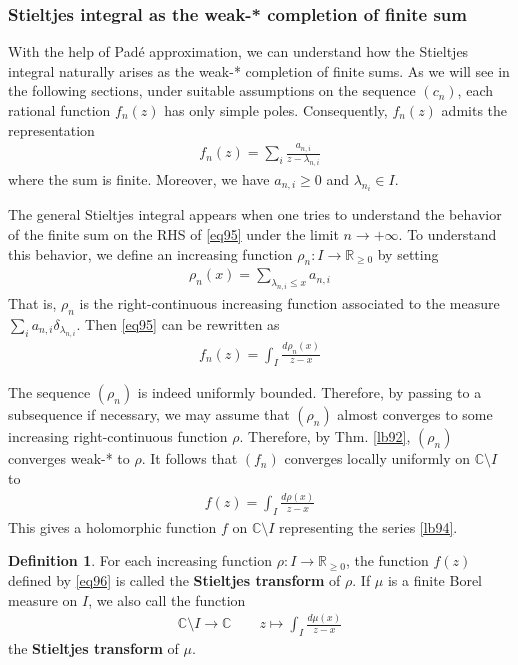\documentclass[12pt,b5paper,notitlepage]{article}
\theoremstyle{definition}
\newtheorem{df}{Definition}[subsection]
\theoremstyle{plain}
\newcommand{\Cbb}{\mathbb C}
\newcommand{\Rbb}{\mathbb R}
\numberwithin{equation}{section}
\begin{document}
\subsubsection{Stieltjes integral as the weak-* completion of finite sum}


With the help of Pad\'e approximation, we can understand how the Stieltjes integral naturally arises as the weak-* completion of finite sums. As we will see in the following sections, under suitable assumptions on the sequence $(c_n)$, each rational function $f_n(z)$ has only simple poles. Consequently, $f_n(z)$ admits the representation
\begin{align}\label{eq95}
f_n(z)=\sum_i \frac{a_{n,i}}{z-\lambda_{n,i}}
\end{align}
where the sum is finite. Moreover, we have $a_{n,i}\geq0$ and $\lambda_{n_i}\in I$.


The general Stieltjes integral appears when one tries to understand the behavior of the finite sum on the RHS of \eqref{eq95} under the limit $n\rightarrow+\infty$. To understand this behavior, we define an increasing function $\rho_n:I\rightarrow\Rbb_{\geq0}$ by setting
\begin{align*}
\rho_n(x)=\sum_{\lambda_{n,i}\leq x}a_{n,i}
\end{align*}
That is, $\rho_n$ is the right-continuous increasing function associated to the measure $\sum_i a_{n,i}\delta_{\lambda_{n,i}}$. Then \eqref{eq95} can be rewritten as
\begin{align*}
f_n(z)=\int_I \frac{d\rho_n(x)}{z-x}
\end{align*}


The sequence $(\rho_n)$ is indeed uniformly bounded. Therefore, by passing to a subsequence if necessary, we may assume that $(\rho_n)$ almost converges to some increasing right-continuous function $\rho$. Therefore, by Thm. \ref{lb92}, $(\rho_n)$ converges weak-* to $\rho$. It follows that $(f_n)$ converges locally uniformly on $\Cbb\setminus I$ to
\begin{align}\label{eq96}
f(z)=\int_I\frac{d\rho(x)}{z-x}
\end{align}
This gives a holomorphic function $f$ on $\Cbb\setminus I$ representing the series \ref{lb94}.

\begin{df}
For each increasing function $\rho:I\rightarrow\Rbb_{\geq0}$, the function $f(z)$ defined by \eqref{eq96} is called the \textbf{Stieltjes transform}  of $\rho$. If $\mu$ is a finite Borel measure on $I$, we also call the function
\begin{align*}
\Cbb\setminus I\rightarrow\Cbb\qquad z\mapsto\int_I\frac{d\mu(x)}{z-x}
\end{align*}
the \textbf{Stieltjes transform} of $\mu$.
\end{df}
\end{document}
